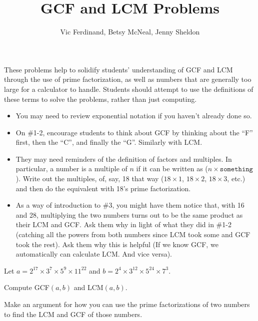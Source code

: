 \documentclass{ximera}
\title{GCF and LCM Problems}
\author{Vic Ferdinand, Betsy McNeal, Jenny Sheldon}
\begin{document}
\begin{abstract} \end{abstract}
\maketitle


\begin{instructorIntro}
These problems help to solidify students' understanding of GCF and LCM through the use of prime factorization, as well as numbers that are generally too large for a calculator to handle.  Students should attempt to use the definitions of these terms to solve the problems, rather than just computing.

\begin{itemize}
    \item You may need to review exponential notation if you haven't already done so.
	\item On \#1-2, encourage students to think about GCF by thinking about the ``F'' first, then the ``C'', and finally the ``G''.  Similarly with LCM.
	\item They may need reminders of the definition of factors and multiples.  In particular, a number is a multiple of $n$ if it can be written as ($n \times \texttt{something}$).  Write out the multiples, of, say, 18 that way ($18\times 1$, $18\times 2$, $18\times 3$, etc.) and then do the equivalent with 18's prime factorization.
	\item As a way of introduction to \#3, you might have them notice that, with 16 and 28, multiplying the two numbers turns out to be the same product as their LCM and GCF.  Ask them why in light of what they did in \#1-2 (catching all the powers from both numbers since LCM took some and GCF took the rest).  Ask them why this is helpful (If we know GCF, we automatically can calculate LCM.  And vice versa).
\end{itemize}
\end{instructorIntro}

\begin{problem} 

Let
$a = 2^{17}\times 3^7 \times 5^9 \times 11^{22}$ and $b =  2^{4}\times 3^{12} \times 5^{24} \times 7^{3}$.

Compute GCF$(a,b)$ and LCM$(a,b)$.

\end{problem}
\vfill
\begin{problem}
Make an argument for how you can use the prime factorizations of two
numbers to find the LCM and GCF of those numbers.
\end{problem}
\vfill
\newpage
\end{document}
